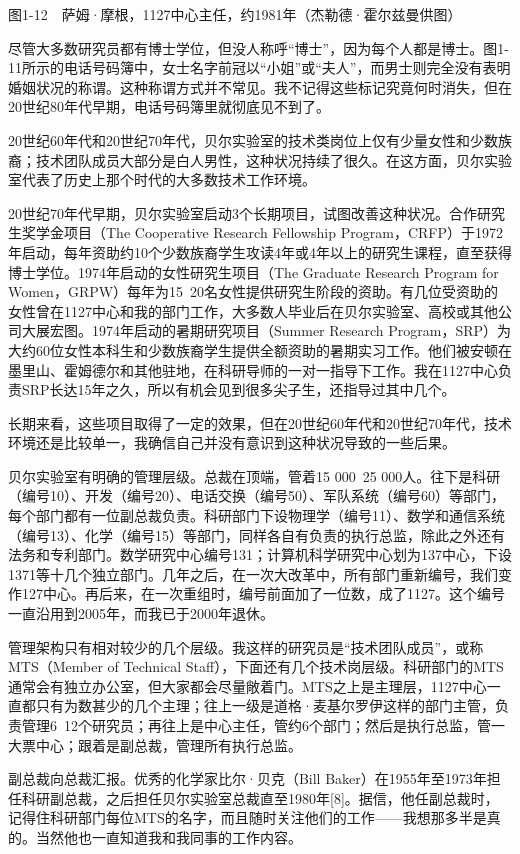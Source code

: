 \documentclass[a4paper,12pt,UTF8,twoside]{ctexbook}
\begin{document}
图1-12　萨姆·摩根，1127中心主任，约1981年（杰勒德·霍尔兹曼供图）

尽管大多数研究员都有博士学位，但没人称呼“博士”，因为每个人都是博士。图1-11所示的电话号码簿中，女士名字前冠以“小姐”或“夫人”，而男士则完全没有表明婚姻状况的称谓。这种称谓方式并不常见。我不记得这些标记究竟何时消失，但在20世纪80年代早期，电话号码簿里就彻底见不到了。

20世纪60年代和20世纪70年代，贝尔实验室的技术类岗位上仅有少量女性和少数族裔；技术团队成员大部分是白人男性，这种状况持续了很久。在这方面，贝尔实验室代表了历史上那个时代的大多数技术工作环境。

20世纪70年代早期，贝尔实验室启动3个长期项目，试图改善这种状况。合作研究生奖学金项目（The Cooperative Research Fellowship Program，CRFP）于1972年启动，每年资助约10个少数族裔学生攻读4年或4年以上的研究生课程，直至获得博士学位。1974年启动的女性研究生项目（The Graduate Research Program for Women，GRPW）每年为15~20名女性提供研究生阶段的资助。有几位受资助的女性曾在1127中心和我的部门工作，大多数人毕业后在贝尔实验室、高校或其他公司大展宏图。1974年启动的暑期研究项目（Summer Research Program，SRP）为大约60位女性本科生和少数族裔学生提供全额资助的暑期实习工作。他们被安顿在墨里山、霍姆德尔和其他驻地，在科研导师的一对一指导下工作。我在1127中心负责SRP长达15年之久，所以有机会见到很多尖子生，还指导过其中几个。

长期来看，这些项目取得了一定的效果，但在20世纪60年代和20世纪70年代，技术环境还是比较单一，我确信自己并没有意识到这种状况导致的一些后果。

贝尔实验室有明确的管理层级。总裁在顶端，管着15 000~25 000人。往下是科研（编号10）、开发（编号20）、电话交换（编号50）、军队系统（编号60）等部门，每个部门都有一位副总裁负责。科研部门下设物理学（编号11）、数学和通信系统（编号13）、化学（编号15）等部门，同样各自有负责的执行总监，除此之外还有法务和专利部门。数学研究中心编号131；计算机科学研究中心划为137中心，下设1371等十几个独立部门。几年之后，在一次大改革中，所有部门重新编号，我们变作127中心。再后来，在一次重组时，编号前面加了一位数，成了1127。这个编号一直沿用到2005年，而我已于2000年退休。

管理架构只有相对较少的几个层级。我这样的研究员是“技术团队成员”，或称MTS（Member of Technical Staff），下面还有几个技术岗层级。科研部门的MTS通常会有独立办公室，但大家都会尽量敞着门。MTS之上是主理层，1127中心一直都只有为数甚少的几个主理；往上一级是道格·麦基尔罗伊这样的部门主管，负责管理6~12个研究员；再往上是中心主任，管约6个部门；然后是执行总监，管一大票中心；跟着是副总裁，管理所有执行总监。

副总裁向总裁汇报。优秀的化学家比尔·贝克（Bill Baker）在1955年至1973年担任科研副总裁，之后担任贝尔实验室总裁直至1980年[8]。据信，他任副总裁时，记得住科研部门每位MTS的名字，而且随时关注他们的工作——我想那多半是真的。当然他也一直知道我和我同事的工作内容。
\end{document}
